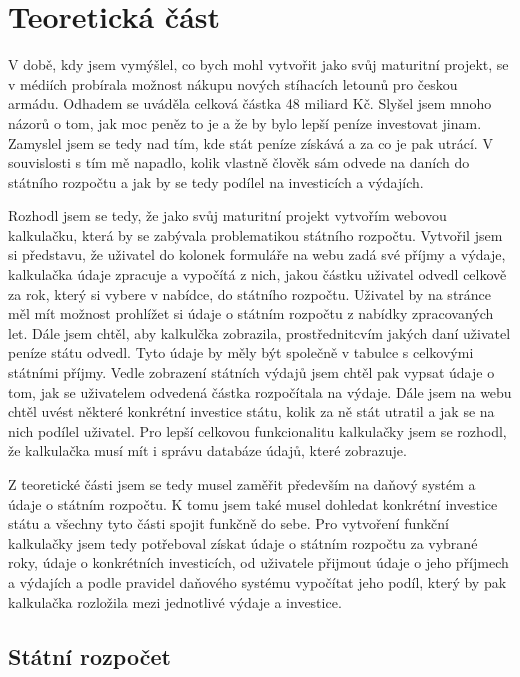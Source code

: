 \documentclass[11pt,a4paper,twoside,openright]{report}
\begin{document}


\setcounter{tocdepth}{2}
\tableofcontents

\chapter{Teoretická část}
\pagestyle{fancy}

V době, kdy jsem vymýšlel, co bych mohl vytvořit jako svůj maturitní projekt, se v médiích probírala možnost nákupu nových stíhacích letounů pro českou armádu. Odhadem se uváděla celková částka 48 miliard Kč. Slyšel jsem mnoho názorů o tom, jak moc peněz to je a že by bylo lepší peníze investovat jinam. Zamyslel jsem se tedy nad tím, kde stát peníze získává a za co je pak utrácí. V souvislosti s tím mě napadlo, kolik vlastně člověk sám odvede na daních do státního rozpočtu a jak by se tedy podílel na investicích a výdajích. 

Rozhodl jsem se tedy, že jako svůj maturitní projekt vytvořím webovou kalkulačku, která by se zabývala problematikou státního rozpočtu. Vytvořil jsem si představu, že uživatel do kolonek formuláře na webu zadá své příjmy a výdaje, kalkulačka údaje zpracuje a vypočítá z nich, jakou částku uživatel odvedl celkově za rok, který si vybere v nabídce, do státního rozpočtu. Uživatel by na stránce měl mít možnost prohlížet si údaje o státním rozpočtu z nabídky zpracovaných let. Dále jsem chtěl, aby kalkulčka zobrazila, prostřednitcvím jakých daní uživatel peníze státu odvedl. Tyto údaje by měly být společně v tabulce s celkovými státními příjmy. Vedle zobrazení státních výdajů jsem chtěl pak vypsat údaje o tom, jak se uživatelem odvedená částka rozpočítala na výdaje. Dále jsem na webu chtěl uvést některé konkrétní investice státu, kolik za ně stát utratil a jak se na nich podílel uživatel. Pro lepší celkovou funkcionalitu kalkulačky jsem se rozhodl, že kalkulačka musí mít i správu databáze údajů, které zobrazuje.

Z teoretické části jsem se tedy musel zaměřit především na daňový systém a údaje o státním rozpočtu. K tomu jsem také musel dohledat konkrétní investice státu a všechny tyto části spojit funkčně do sebe. Pro vytvoření funkční kalkulačky jsem tedy potřeboval získat údaje o státním rozpočtu za vybrané roky, údaje o konkrétních investicích, od uživatele přijmout údaje o jeho příjmech a výdajích a podle pravidel daňového systému vypočítat jeho podíl, který by pak kalkulačka rozložila mezi jednotlivé výdaje a investice.

\section{Státní rozpočet}
\end{document}
